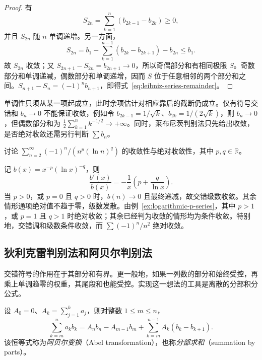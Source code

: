 \begin{proof}
有
\[
    S_{2n}=\sum_{k=1}^n(b_{2k-1}-b_{2k})\geq0,
\]
并且 $S_{2n}$ 随 $n$ 单调递增。另一方面，
\[
    S_{2n}=b_1-\sum_{k=1}^{n-1}(b_{2k}-b_{2k+1})-b_{2n}\leq b_1.
\]
故 $S_{2n}$ 收敛；又 $S_{2n+1}-S_{2n}=b_{2n+1}\to0$，所以奇偶部分和有相同极限 $S$。奇数部分和单调递减，偶数部分和单调递增，因而 $S$ 位于任意相邻的两个部分和之间。$S_{n+1}-S_n=(-1)^nb_{n+1}$，即得式~\eqref{eq:leibniz-series-remainder}。
\end{proof}

单调性只须从某一项起成立，此时余项估计对相应靠后的截断仍成立。仅有符号交错和 $b_n\to0$ 不能保证收敛，例如令 $b_{2k-1}=1/\sqrt{k}$、$b_{2k}=1/(2\sqrt{k})$，则 $b_n\to0$，但偶数部分和为 $\frac12\sum_{k=1}^n k^{-1/2}\to+\infty$。同时，莱布尼茨判别法只先给出收敛，是否绝对收敛还需另行判断 $\sum b_n$。

\begin{example}
\label{ex:alternating-logarithmic-p-series}
讨论 $\sum_{n=2}^{\infty}(-1)^n/(n^p(\ln n)^q)$ 的收敛性与绝对收敛性，其中 $p,q\in\mathbb R$。
\end{example}

\begin{solve}
记 $b(x)=x^{-p}(\ln x)^{-q}$，则
\[
    \frac{b'(x)}{b(x)}=-\frac1x\left(p+\frac q{\ln x}\right).
\]
当 $p>0$，或 $p=0$ 且 $q>0$ 时，$b(n)\to0$ 且最终递减，故交错级数收敛。其余情形通项绝对值不趋于零，级数发散。由例~\ref{ex:logarithmic-p-series}，其中 $p>1$，或 $p=1$ 且 $q>1$ 时绝对收敛；其余已经判为收敛的情形均为条件收敛。特别地，交错调和级数条件收敛，而 $\sum(-1)^n/n^2$ 绝对收敛。
\end{solve}

\subsection{狄利克雷判别法和阿贝尔判别法}
\label{subsec:dirichlet-and-abel-tests}

交错符号的作用在于其部分和有界。更一般地，如果一列数的部分和始终受控，再乘上单调趋零的权重，其尾段和也能受控。实现这一想法的工具是离散的分部积分公式。

\begin{lemma}[阿贝尔变换]
\label{lem:abel-summation-by-parts}
设 $A_0=0$、$A_k=\sum_{j=1}^k a_j$，则对整数 $1\leq m\leq n$，
\begin{equation}
    \sum_{k=m}^n a_kb_k
    =A_nb_n-A_{m-1}b_m
      +\sum_{k=m}^{n-1}A_k(b_k-b_{k+1}).
    \label{eq:abel-summation-by-parts}
\end{equation}
该恒等式称为\emph{阿贝尔变换}（Abel transformation），也称\emph{分部求和}（summation by parts）。
\end{lemma}


